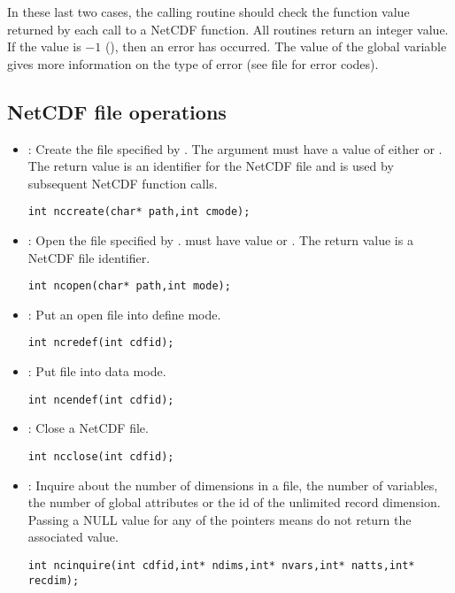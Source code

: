 In these last two cases, the calling routine should check the function
value returned by each call to a NetCDF function. All routines return
an integer value. If the value is $-1$ (), then an
error has occurred. The value of the global variable 
gives more information on the type of error (see file 
for error codes).

\subsection{NetCDF file operations}

\begin{itemize}

\item {} : Create the file specified by .
The argument  must have a 
value of either  or . The return
value is an identifier for the NetCDF file and is used by subsequent
NetCDF function calls.
\begin{verbatim}
int nccreate(char* path,int cmode);
\end{verbatim}

\item {} : Open the file specified by . 
must have value 
 or . The return value is a NetCDF
file identifier.
\begin{verbatim}
int ncopen(char* path,int mode);
\end{verbatim}

\item {} : Put an open file into define mode. 
\begin{verbatim}
int ncredef(int cdfid);
\end{verbatim}

\item {} : Put file into data mode. 
\begin{verbatim}
int ncendef(int cdfid);
\end{verbatim}

\item {} : Close a NetCDF file. 
\begin{verbatim}
int ncclose(int cdfid);
\end{verbatim}

\item {} : Inquire about the number of dimensions in a file, the
number of 
variables, the number of global attributes or the id of the unlimited
record dimension. Passing a NULL value for any of the pointers means
do not return the associated value.
\begin{verbatim}
int ncinquire(int cdfid,int* ndims,int* nvars,int* natts,int* recdim);
\end{verbatim}


\end{itemize}
